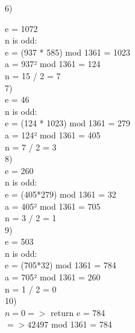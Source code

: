 6)

e = 1072\\
n is odd:\\
e = (937 * 585) mod 1361 = 1023\\
a = 937² mod 1361 = 124\\
n = 15 / 2 = 7\\

7)\\

e = 46\\
n is odd:\\
e = (124 * 1023) mod 1361 = 279\\
a = 124² mod 1361 = 405\\
n = 7 / 2 = 3\\

8)\\

e = 260\\
n is odd:\\
e = (405*279) mod 1361 = 32\\
a = 405² mod 1361 = 705\\
n = 3 / 2 = 1\\

9)\\

e = 503\\
n is odd:\\
e = (705*32) mod 1361 = 784\\
a = 705² mod 1361 = 260\\
n = 1 / 2 = 0\\

10)\\

$n = 0 =>$ return e = 784\\

$=> 42497$ mod 1361 = 784







